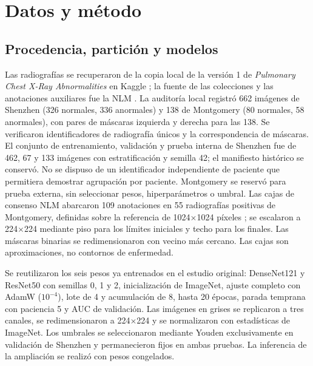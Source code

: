 \documentclass[conference]{IEEEtran}
\begin{document}
\section{Datos y método}
\subsection{Procedencia, partición y modelos}
Las radiografías se recuperaron de la copia local de la versión 1 de \emph{Pulmonary Chest X-Ray Abnormalities} en Kaggle \cite{kaggle}; la fuente de las colecciones y las anotaciones auxiliares fue la NLM \cite{nlmdata}. La auditoría local registró 662 imágenes de Shenzhen (326 normales, 336 anormales) y 138 de Montgomery (80 normales, 58 anormales), con pares de máscaras izquierda y derecha para las 138. Se verificaron identificadores de radiografía únicos y la correspondencia de máscaras. El conjunto de entrenamiento, validación y prueba interna de Shenzhen fue de 462, 67 y 133 imágenes con estratificación y semilla 42; el manifiesto histórico se conservó. No se dispuso de un identificador independiente de paciente que permitiera demostrar agrupación por paciente. Montgomery se reservó para prueba externa, sin seleccionar pesos, hiperparámetros o umbral. Las cajas de consenso NLM abarcaron 109 anotaciones en 55 radiografías positivas de Montgomery, definidas sobre la referencia de 1024$\times$1024 píxeles \cite{nlmdata,rajaraman2021}; se escalaron a 224$\times$224 mediante piso para los límites iniciales y techo para los finales. Las máscaras binarias se redimensionaron con vecino más cercano. Las cajas son aproximaciones, no contornos de enfermedad.

Se reutilizaron los seis pesos ya entrenados en el estudio original: DenseNet121 y ResNet50 con semillas 0, 1 y 2, inicialización de ImageNet, ajuste completo con AdamW ($10^{-4}$), lote de 4 y acumulación de 8, hasta 20 épocas, parada temprana con paciencia 5 y AUC de validación. Las imágenes en grises se replicaron a tres canales, se redimensionaron a 224$\times$224 y se normalizaron con estadísticas de ImageNet. Los umbrales se seleccionaron mediante Youden exclusivamente en validación de Shenzhen y permanecieron fijos en ambas pruebas. La inferencia de la ampliación se realizó con pesos congelados.
\end{document}

